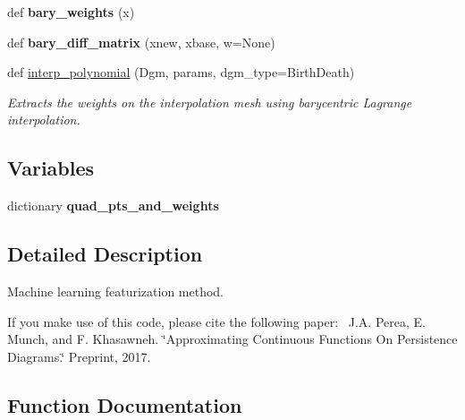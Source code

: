 \begin{DoxyCompactItemize}
def {\bfseries bary\+\_\+weights} (x)
\item 
\mbox{\label{namespaceteaspoon_1_1_m_l_1_1feature__functions_a74ab53ba7723dcc695508168cd6f0fcd}} 
def {\bfseries bary\+\_\+diff\+\_\+matrix} (xnew, xbase, w=None)
\item 
def \hyperlink{namespaceteaspoon_1_1_m_l_1_1feature__functions_a006083e689fab1e041a2cf933397e8ee}{interp\+\_\+polynomial} (Dgm, params, dgm\+\_\+type=\textquotesingle{}Birth\+Death\textquotesingle{})
\begin{DoxyCompactList}\small\item\em Extracts the weights on the interpolation mesh using barycentric Lagrange interpolation. \end{DoxyCompactList}\end{DoxyCompactItemize}
\subsection*{Variables}
\begin{DoxyCompactItemize}
\item 
dictionary {\bfseries quad\+\_\+pts\+\_\+and\+\_\+weights}
\end{DoxyCompactItemize}


\subsection{Detailed Description}
Machine learning featurization method. 

If you make use of this code, please cite the following paper\+:~\newline
 J.\+A. Perea, E. Munch, and F. Khasawneh. \char`\"{}\+Approximating Continuous Functions On Persistence Diagrams.\char`\"{} Preprint, 2017. 

\subsection{Function Documentation}
\mbox{\label{namespaceteaspoon_1_1_m_l_1_1feature__functions_a006083e689fab1e041a2cf933397e8ee}} 
